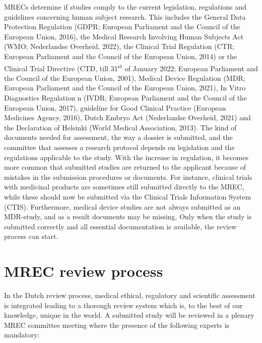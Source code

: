\documentclass[authordate, meta, issue]{jote-new-article}
\begin{document}
MRECs determine if studies comply to the current legislation, regulations and guidelines concerning human subject research. This includes the General Data Protection Regulation (GDPR; European Parliament and the Council of the European Union, 2016), the Medical Research Involving Human Subjects Act (WMO; Nederlandse Overheid, 2022), the Clinical Trial Regulation (CTR; European Parliament and the Council of the European Union, 2014) or the Clinical Trial Directive (CTD, till 31\textsuperscript{st} of January 2022; European Parliament and the Council of the European Union, 2001), Medical Device Regulation (MDR; European Parliament and the Council of the European Union, 2021), In Vitro Diagnostics Regulation n (IVDR; European Parliament and the Council of the European Union, 2017), guideline for Good Clinical Practice (European Medicines Agency, 2016), Dutch Embryo Act (Nederlandse Overheid, 2021) and the Declaration of Helsinki (World Medical Association, 2013). The kind of documents needed for assessment, the way a dossier is submitted, and the committee that assesses a research protocol depends on legislation and the regulations applicable to the study. With the increase in regulation, it becomes more common that submitted studies are returned to the applicant because of mistakes in the submission procedures or documents. For instance, clinical trials with medicinal products are sometimes still submitted directly to the MREC, while these should now be submitted via the Clinical Trials Information System (CTIS). Furthermore, medical device studies are not always submitted as an MDR-study, and as a result documents may be missing. Only when the study is submitted correctly and all essential documentation is available, the review process can start.







\section{MREC review process}



In the Dutch review process, medical ethical, regulatory and scientific assessment is integrated leading to a thorough review system which is, to the best of our knowledge, unique in the world. A submitted study will be reviewed in a plenary MREC committee meeting where the presence of the following experts is mandatory:
\end{document}
